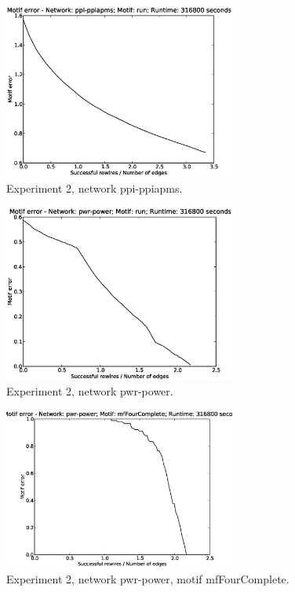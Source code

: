 \begin{figure}[p]
\centering
\includegraphics[width=3in]{Figures/motif_error-ppi-ppiapms-run.eps}
\caption{Experiment 2, network ppi-ppiapms.}
\label{fig:exp2-ppi-ppiapms-run}
\end{figure}

\begin{figure}[p]
\centering
\includegraphics[width=3in]{Figures/motif_error-pwr-power-run.eps}
\caption{Experiment 2, network pwr-power.}
\label{fig:exp2-pwr-power-run}
\end{figure}

\begin{figure}[p]
\centering
\includegraphics[width=3in]{Figures/motif_error-pwr-power-mfFourComplete.eps}
\caption{Experiment 2, network pwr-power, motif mfFourComplete.}
\label{fig:exp2-pwr-power-mfFourComplete}
\end{figure}

